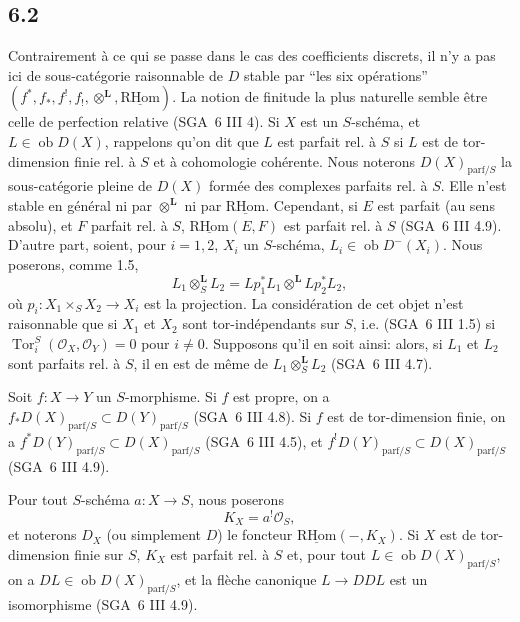 \documentclass[11pt]{article}
\providecommand{\cO}{\mathcal{O}}
\DeclareMathOperator{\Tor}{Tor}
\newcommand{\R}{\mathrm{R}}\newcommand{\RHomCore}{\mathrm{RHom}}
\providecommand{\RHom}{\RHomCore}
\providecommand{\uRHom}{\underline{\RHom}}
\providecommand{\RHom}{\RHomCore}
\providecommand{\RHom}{\R\mathcal{H}om}
\providecommand{\R}{\mathrm R}
\providecommand{\RHom}{\RHomCore}
\begin{document}
\subsection*{6.2}
Contrairement à ce qui se passe dans le cas des coefficients discrets, il n'y a pas ici de sous-catégorie raisonnable de $D$ stable par ``les six opérations'' $(f^*,f_*,f^!,f_!,\otimes^{\mathbf L},\uRHom)$. La notion de finitude la plus naturelle semble être celle de perfection relative (SGA~6 III 4). Si $X$ est un $S$-schéma, et $L\in\operatorname{ob}D(X)$, rappelons qu'on dit que $L$ est parfait rel. à $S$ si $L$ est de tor-dimension finie rel. à $S$ et à cohomologie cohérente. Nous noterons $D(X)_{\mathrm{parf}/S}$ la sous-catégorie pleine de $D(X)$ formée des complexes parfaits rel. à $S$. Elle n'est stable en général ni par $\otimes^{\mathbf L}$ ni par $\uRHom$. Cependant, si $E$ est parfait (au sens absolu), et $F$ parfait rel. à $S$, $\uRHom(E,F)$ est parfait rel. à $S$ (SGA~6 III 4.9). D'autre part, soient, pour $i=1,2$, $X_i$ un $S$-schéma, $L_i\in\operatorname{ob}D^{-}(X_i)$. Nous poserons, comme 1.5,
\[
L_1\otimes_S^{\mathbf L}L_2=Lp_1^*L_1\otimes^{\mathbf L}Lp_2^*L_2,
\]
où $p_i:X_1\times_SX_2\to X_i$ est la projection. La considération de cet objet n'est raisonnable que si $X_1$ et $X_2$ sont tor-indépendants sur $S$, i.e. (SGA~6 III 1.5) si $\Tor_i^S(\cO_X,\cO_Y)=0$ pour $i\ne0$. Supposons qu'il en soit ainsi: alors, si $L_1$ et $L_2$ sont parfaits rel. à $S$, il en est de même de $L_1\otimes_S^{\mathbf L}L_2$ (SGA~6 III 4.7).

Soit $f:X\to Y$ un $S$-morphisme. Si $f$ est propre, on a $f_*D(X)_{\mathrm{parf}/S}\subset D(Y)_{\mathrm{parf}/S}$ (SGA~6 III 4.8). Si $f$ est de tor-dimension finie, on a $f^*D(Y)_{\mathrm{parf}/S}\subset D(X)_{\mathrm{parf}/S}$ (SGA~6 III 4.5), et $f^!D(Y)_{\mathrm{parf}/S}\subset D(X)_{\mathrm{parf}/S}$ (SGA~6 III 4.9).

Pour tout $S$-schéma $a:X\to S$, nous poserons
\begin{equation}
\tag{6.2.1}
K_X=a^!\cO_S,
\end{equation}
et noterons $D_X$ (ou simplement $D$) le foncteur $\uRHom(-,K_X)$. Si $X$ est de tor-dimension finie sur $S$, $K_X$ est parfait rel. à $S$ et, pour tout $L\in\operatorname{ob}D(X)_{\mathrm{parf}/S}$, on a $DL\in\operatorname{ob}D(X)_{\mathrm{parf}/S}$, et la flèche canonique $L\to DDL$ est un isomorphisme (SGA~6 III 4.9).
\end{document}

